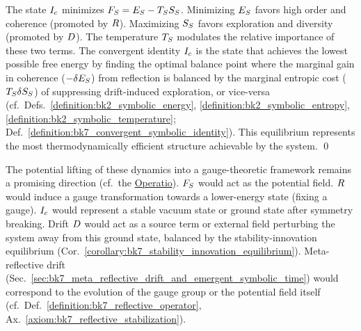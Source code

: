 \begin{demonstratio}
\label{demonstratio:bk7_free_energy_balance_equilibrium}
The state \(I_c\) minimizes \(F_S = E_S - T_S S_S\). Minimizing \(E_S\) favors high order and coherence (promoted by \(R\)). Maximizing \(S_S\) favors exploration and diversity (promoted by \(D\)). The temperature \(T_S\) modulates the relative importance of these two terms. The convergent identity \(I_c\) is the state that achieves the lowest possible free energy by finding the optimal balance point where the marginal gain in coherence (\(-\delta E_S\)) from reflection is balanced by the marginal entropic cost (\(T_S \delta S_S\)) of suppressing drift-induced exploration, or vice-versa (cf.~Defs.~\ref{definition:bk2_symbolic_energy}, \ref{definition:bk2_symbolic_entropy}, \ref{definition:bk2_symbolic_temperature}; Def.~\ref{definition:bk7_convergent_symbolic_identity}). This equilibrium represents the most thermodynamically efficient structure achievable by the system. \qed
\end{demonstratio}
\begin{remark}
\label{remark:bk7_gauge_theoretic_perspective}
The potential lifting of these dynamics into a gauge-theoretic framework remains a promising direction (cf.~the \hyperref[sec:bk1_operatio]{Operatio}). \(F_S\) would act as the potential field. \(R\) would induce a gauge transformation towards a lower-energy state (fixing a gauge). \(I_c\) would represent a stable vacuum state or ground state after symmetry breaking. Drift \(D\) would act as a source term or external field perturbing the system away from this ground state, balanced by the stability-innovation equilibrium (Cor.~\ref{corollary:bk7_stability_innovation_equilibrium}). Meta-reflective drift (Sec.~\ref{sec:bk7_meta_reflective_drift_and_emergent_symbolic_time}) would correspond to the evolution of the gauge group or the potential field itself (cf.~Def.~\ref{definition:bk7_reflective_operator}, Ax.~\ref{axiom:bk7_reflective_stabilization}).
\end{remark}
